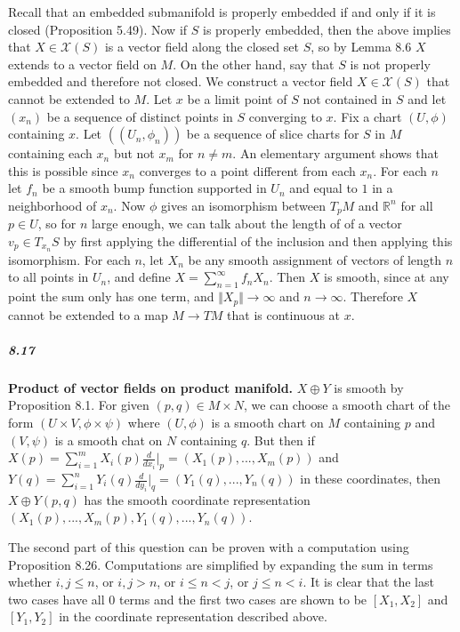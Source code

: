 \documentclass[10pt,letter]{article}
\begin{document}
Recall that an embedded submanifold is properly embedded if and only if it is closed (Proposition 5.49). Now if $S$ is properly embedded, then the above implies that $X \in \mathcal{X}(S)$ is a vector field along the closed set $S$, so by Lemma 8.6 $X$ extends to a vector field on $M$. On the other hand, say that $S$ is not properly embedded and therefore not closed. We construct a vector field $X \in \mathcal{X}(S)$ that cannot be extended to $M$. Let $x$ be a limit point of $S$ not contained in $S$ and let $(x_n)$ be a sequence of distinct points in $S$ converging to $x$. Fix a chart $(U,\phi)$ containing $x$. Let $((U_n,\phi_n))$ be a sequence of slice charts for $S$ in $M$ containing each $x_n$ but not $x_m$ for $n \neq m$. An elementary argument shows that this is possible since $x_n$ converges to a point different from each $x_n$. For each $n$ let $f_n$ be a smooth bump function supported in $U_n$ and equal to $1$ in a neighborhood of $x_n$. Now $\phi$ gives an isomorphism between $T_pM$ and $\mathbb{R}^n$ for all $p \in U$, so for $n$ large enough, we can talk about the length of of a vector $v_p \in T_{x_n}S$ by first applying the differential of the inclusion and then applying this isomorphism. For each $n$, let $X_n$ be any smooth assignment of vectors of length $n$ to all points in $U_n$, and define $X = \sum_{n=1}^\infty f_n X_n$. Then $X$ is smooth, since at any point the sum only has one term, and $\Vert X_p \Vert \rightarrow \infty$ and $n \rightarrow \infty$. Therefore $X$ cannot be extended to a map $M \rightarrow TM$ that is continuous at $x$. 

\subparagraph{8.17} {\bf Product of vector fields on product manifold.} $X \oplus Y$ is smooth by Proposition 8.1. For given $(p,q) \in M \times N$, we can choose a smooth chart of the form $(U \times V, \phi \times \psi)$ where $(U,\phi)$ is a smooth chart on $M$ containing $p$ and $(V,\psi)$ is a smooth chat on $N$ containing $q$. But then if $X(p) = \sum_{i=1}^m X_i(p) \frac{d}{dx_i}\vert_p = (X_1(p),...,X_m(p))$ and $Y(q) = \sum_{i=1}^n Y_i(q) \frac{d}{dy_i}\vert_q = (Y_1(q),...,Y_n(q))$ in these coordinates, then $X \oplus Y(p,q)$ has the smooth coordinate representation $(X_1(p),...,X_m(p),Y_1(q),...,Y_n(q))$. 

The second part of this question can be proven with a computation using Proposition 8.26. Computations are simplified by expanding the sum in terms whether $i,j \leq n$, or $i,j > n$, or $i \leq n < j$, or $j \leq n < i$. It is clear that the last two cases have all $0$ terms and the first two cases are shown to be $[X_1,X_2]$ and $[Y_1,Y_2]$ in the coordinate representation described above. 
\end{document}

